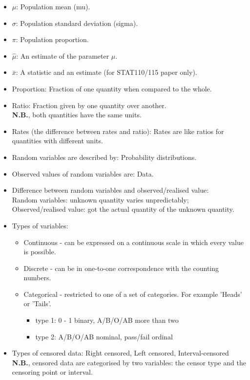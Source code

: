 \documentclass[12pt]{book}
\begin{document}
\begin{itemize}
\item $\mu$: Population mean (mu).
\item $\sigma$: Population standard deviation (sigma).
\item $\pi$: Population proportion.
\item $\hat{\mu}$: An estimate of the parameter $\mu$.
\item $\bar{x}$: A statistic and an estimate (for STAT110/115 paper only).
\item Proportion: Fraction of one quantity when compared to the whole.
\item Ratio: Fraction given by one quantity over another. \\
\textbf{N.B.}, both quantities have the same units.
\item Rates (the difference between rates and ratio): Rates are like ratios for quantities with different units.
\item Random variables are described by: Probability distributions.
\item Observed values of random variables are: Data.
\item Difference between random variables and observed/realised value: \\
Random variables: unknown quantity varies unpredictably; \\
Observed/realised value: got the actual quantity of the unknown quantity.
\item Types of variables: 
\begin{itemize}
\item Continuous - can be expressed on a continuous scale in which every value is possible.
\item Discrete - can be in one-to-one correspondence with the counting numbers.
\item Categorical - restricted to one of a set of categories. For example 'Heads' or 'Tails'.
\begin{itemize}
\item type 1: 0 - 1 binary, A/B/O/AB more than two
\item type 2: A/B/O/AB nominal, pass/fail ordinal
\end{itemize}
\end{itemize}
\item Types of censored data: Right censored, Left censored, Interval-censored \\
\textbf{N.B.}, censored data are categorised by two variables: the censor type and the censoring point or interval.

\end{itemize}
\end{document}
